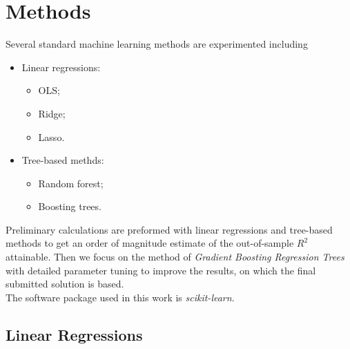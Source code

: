\documentclass[
11pt, %
a4paper, %
oneside, %
headinclude,footinclude, %
BCOR5mm, %
]{scrartcl}
\begin{document}
%
 
\newpage 

\section{Methods}
Several standard machine learning methods are experimented including
\begin{itemize}[noitemsep]
\item Linear regressions:
\begin{itemize}[noitemsep]
	\item OLS;
	\item Ridge;
	\item Lasso.
\end{itemize}
\item Tree-based methds:
\begin{itemize}[noitemsep]
	\item Random forest;
	\item Boosting trees.
\end{itemize}
\end{itemize}
Preliminary calculations are preformed with linear regressions and tree-based methods to get an order of magnitude estimate of the out-of-sample $R^2$ attainable. Then we focus on the method of \textit{Gradient Boosting Regression Trees} with detailed parameter tuning to improve the results, on which the final submitted solution is based.\\
\newline
The software package used in this work is \textit{scikit-learn}.

\subsection{Linear Regressions}
\end{document}
